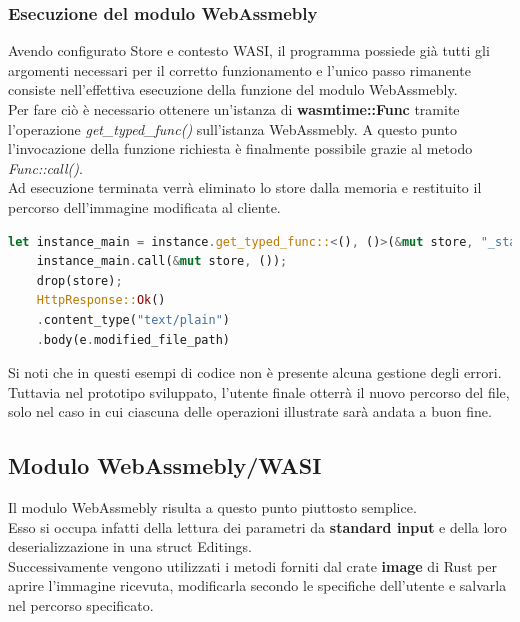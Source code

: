\subsubsection{Esecuzione del modulo WebAssmebly}
Avendo configurato Store e contesto WASI, il programma possiede già tutti gli argomenti necessari per il corretto funzionamento e l'unico passo rimanente consiste nell'effettiva esecuzione della funzione del modulo WebAssmebly.
\\Per fare ciò è  necessario ottenere un'istanza di \textbf{wasmtime::Func} tramite l'operazione \emph{get\_typed\_func()} sull'istanza WebAssmebly.
A questo punto l'invocazione della funzione richiesta è finalmente possibile grazie al metodo \emph{Func::call()}.
\\Ad esecuzione terminata verrà eliminato lo store dalla memoria e restituito il percorso dell'immagine modificata al cliente.
\begin{lstlisting}[language=rust,caption={File handlers.rs: invocazione funzione \_start presente nel modulo Wasm}, showstringspaces=false]
    let instance_main = instance.get_typed_func::<(), ()>(&mut store, "_start");
    instance_main.call(&mut store, ());
    drop(store);
    HttpResponse::Ok()
    .content_type("text/plain")
    .body(e.modified_file_path)
\end{lstlisting}
Si noti che in questi esempi di codice non è presente alcuna gestione degli errori. Tuttavia nel prototipo sviluppato, l'utente finale otterrà il nuovo percorso del file, solo nel caso in cui ciascuna delle operazioni illustrate sarà andata a buon fine.
\subsection{Modulo WebAssmebly/WASI}
Il modulo WebAssmebly risulta a questo punto piuttosto semplice.
\\Esso si occupa infatti della lettura dei parametri da \textbf{standard input} e della loro deserializzazione in una struct Editings.
\\Successivamente vengono utilizzati i metodi forniti dal crate \textbf{image} di Rust per aprire l'immagine ricevuta, modificarla secondo le specifiche dell'utente e salvarla nel percorso specificato.\cite{rust:image}

